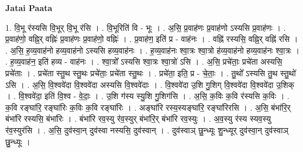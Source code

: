 \documentclass[17pt]{extarticle}
\begin{document}
\textbf{Jatai Paata} \newline

1. वि॒भू र॑स्यसि वि॒भूर् वि॒भू र॑सि । . वि॒भूरिति॑ वि - भूः । . अ॒सि॒ प्र॒वाह॑णः प्र॒वाह॑णो ऽस्यसि प्र॒वाह॑णः । . प्र॒वाह॑णो॒ वह्नि॒र् वह्निः॑ प्र॒वाह॑णः प्र॒वाह॑णो॒ वह्निः॑ । . प्र॒वाह॑ण॒ इति॑ प्र - वाह॑नः । . वह्नि॑ रस्यसि॒ वह्नि॒र् वह्नि॑ रसि । . अ॒सि॒ ह॒व्य॒वाह॑नो हव्य॒वाह॑नो ऽस्यसि हव्य॒वाह॑नः । . ह॒व्य॒वाह॑नः श्वा॒त्रः श्वा॒त्रो ह॑व्य॒वाह॑नो हव्य॒वाह॑नः श्वा॒त्रः । . ह॒व्य॒वाह॑न॒ इति॑ हव्य - वाह॑नः । . श्वा॒त्रो᳚ ऽस्यसि श्वा॒त्रः श्वा॒त्रो॑ ऽसि । . अ॒सि॒ प्रचे॑ताः॒ प्रचे॑ता अस्यसि॒ प्रचे॑ताः । . प्रचे॑ता स्तु॒थ स्तु॒थः प्रचे॑ताः॒ प्रचे॑ता स्तु॒थः । . प्रचे॑ता॒ इति॒ प्र - चे॒ताः॒ । . तु॒थो᳚ ऽस्यसि तु॒थ स्तु॒थो॑ ऽसि । . अ॒सि॒ वि॒श्ववे॑दा वि॒श्ववे॑दा अस्यसि वि॒श्ववे॑दाः । . वि॒श्ववे॑दा उ॒शि गु॒शिग् वि॒श्ववे॑दा वि॒श्ववे॑दा उ॒शिक् । . वि॒श्ववे॑दा॒ इति॑ वि॒श्व - वे॒दाः॒ । . उ॒शि ग॑स्य स्यु॒शि गु॒शिग॑सि । . अ॒सि॒ क॒विः क॒वि र॑स्यसि क॒विः । . क॒वि रङ्घा॑रि॒ रङ्घा॑रिः क॒विः क॒वि रङ्घा॑रिः । . अङ्घा॑रि रस्य॒स्यङ्घा॑रि॒ रङ्घा॑रिरसि । . अ॒सि॒ बंभा॑रि॒र् बंभा॑रि रस्यसि॒ बंभा॑रिः । . बंभा॑रि रव॒स्यु र॑व॒स्युर् बंभा॑रि॒र् बंभा॑रि रव॒स्युः । . अ॒व॒स्यु र॑स्य स्यव॒स्यु र॑व॒स्युर॑सि । . अ॒सि॒ दुव॑स्वा॒न् दुव॑स्वा नस्यसि॒ दुव॑स्वान् । . दुव॑स्वाञ् छु॒न्ध्यूः शु॒न्ध्यूर् दुव॑स्वा॒न् दुव॑स्वाञ् छु॒न्ध्यूः । \newline
\end{document}
